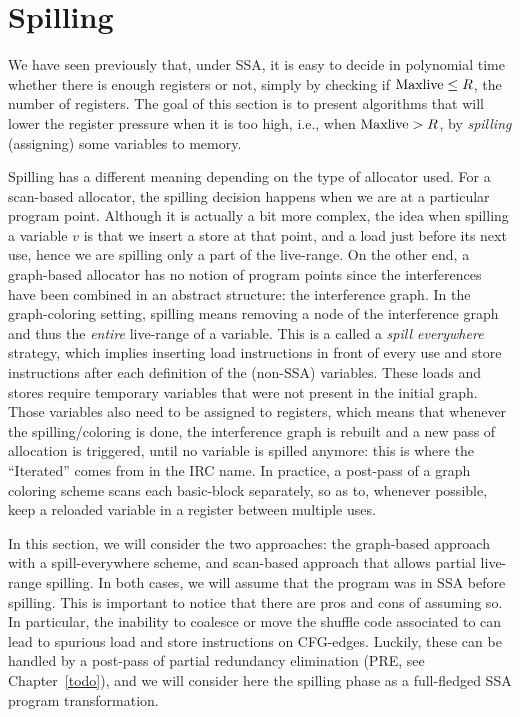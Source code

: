 {  %




\section{Spilling}

We have seen previously that, under SSA, it is easy to decide in polynomial time whether there is enough registers or not, simply by checking if $\mathrm{Maxlive} \leq R$, the number of registers.
The goal of this section is to present algorithms that will lower the register pressure when it is too high, i.e., when $\mathrm{Maxlive} > R$, by \emph{spilling} (assigning) some variables to memory.

Spilling has a different meaning depending on the type of allocator used.
For a scan-based allocator, the spilling decision happens when we are at a particular program point.
Although it is actually a bit more complex, the idea when spilling a variable $v$ is that we insert a store at that point, and a load just before its next use, hence we are spilling only a part of the live-range.
%
On the other end, a graph-based allocator has no notion of program points since the interferences have been combined in an abstract structure: the interference graph.
In the graph-coloring setting, spilling means removing a node of the interference graph and thus the \emph{entire} live-range of a variable.
This is a called a \emph{spill everywhere} strategy, which implies inserting load instructions in front of every use and store instructions after each definition of the (non-SSA) variables.
These loads and stores require temporary variables that were not present in the initial graph.
Those variables also need to be assigned to registers, which means that whenever the spilling/coloring is done, the interference graph is rebuilt and a new pass of allocation is triggered, until no variable is spilled anymore: this is where the ``Iterated'' comes from in the IRC name.
In practice, a post-pass of a graph coloring scheme scans each basic-block separately, so as to, whenever possible, keep a reloaded variable in a register between multiple uses.

\smallskip

In this section, we will consider the two approaches: the graph-based approach with a spill-everywhere scheme, and scan-based approach that allows partial live-range spilling.
%
In both cases, we will assume that the program was in SSA before spilling. 
This is important to notice that there are pros and cons of assuming so. 
In particular, the inability to coalesce or move the shuffle code associated to \phifuns can lead to spurious load and store instructions on CFG-edges.
Luckily, these can be handled by a post-pass of partial redundancy elimination (PRE, see Chapter~\ref{todo}), and we will consider here the spilling phase as a full-fledged SSA program transformation.

}
